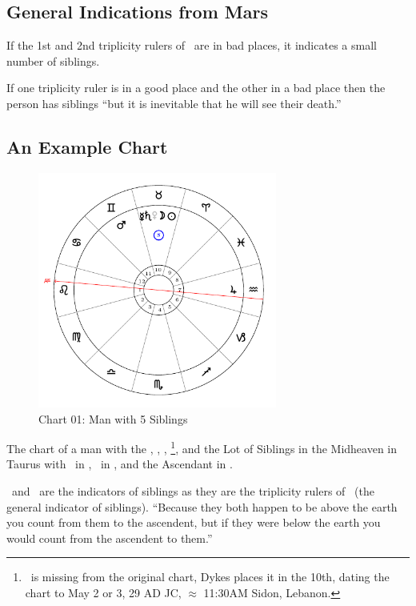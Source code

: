 \subsection{General Indications from Mars}
If the 1st and 2nd triplicity rulers of \Mars\, are in bad places, it indicates a small number of siblings.

If one triplicity ruler is in  a good place and the other in a bad place then the person has siblings ``but it is inevitable that he will see their death.''

\subsection{An Example Chart}
\vspace{-1em}
\begin{figure}[H]
\centering
\includegraphics[width=0.7\textwidth]{charts/1_01}
\vspace{-1em}
\caption{Chart 01: Man with 5 Siblings}
\end{figure}

The chart of a man with the \Sun, \Moon, \Saturn, \Mercury\footnote{\Venus\, is missing from the original chart, Dykes places it in the 10th, dating the chart to May 2 or 3, 29 AD JC, $\approx$ 11:30AM Sidon, Lebanon.}, and the Lot of Siblings in the Midheaven in Taurus with \Mars\, in \Gemini, \Jupiter\, in \Aquarius, and the Ascendant in \Leo.

\Saturn\, and \Mercury\, are the indicators of siblings as they are the triplicity rulers of \Mars\, (the general indicator of siblings). ``Because they both happen to be above the earth you count from them to the ascendent, but if they were below the earth you would count from the ascendent to them.''

